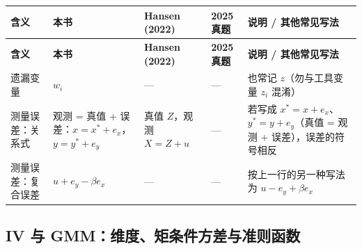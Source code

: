 {\renewcommand{\arraystretch}{1.15}\begin{longtable}{@{}>{\raggedright\arraybackslash\small}p{2.3cm}>{\raggedright\arraybackslash\small}p{3.7cm}>{\raggedright\arraybackslash\small}p{3.0cm}>{\raggedright\arraybackslash\small}p{2.2cm}>{\raggedright\arraybackslash\small}p{3.4cm}@{}}
\toprule
\textbf{含义} & \textbf{本书} & \textbf{Hansen (2022)} & \textbf{2025 真题} & \textbf{说明 / 其他常见写法}\\
\midrule
\endfirsthead
\toprule
\textbf{含义} & \textbf{本书} & \textbf{Hansen (2022)} & \textbf{2025 真题} & \textbf{说明 / 其他常见写法}\\
\midrule
\endhead
\bottomrule
\endlastfoot
遗漏变量 & $w_i$ & — & — & 也常记 $z$（勿与工具变量 $z_i$ 混淆）\\
\addlinespace[1pt]
测量误差：关系式 & 观测 = 真值 + 误差：$x=x^*+e_x$，$y=y^*+e_y$ & 真值 $Z$，观测 $X=Z+u$ & — & 若写成 $x^*=x+e_x$、$y^*=y+e_y$（真值 = 观测 + 误差），误差的符号相反\\
\addlinespace[1pt]
测量误差：复合误差 & $u+e_y-\beta e_x$ & — & — & 按上一行的另一种写法为 $u-e_y+\beta e_x$\\
\end{longtable}}


\subsection{IV 与 GMM：维度、矩条件方差与准则函数}

